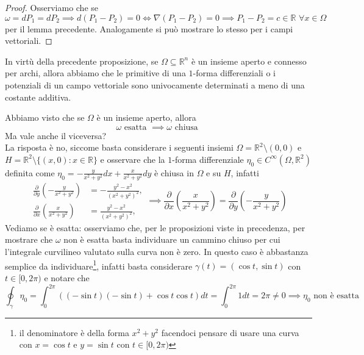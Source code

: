 \begin{proof}
Osserviamo che se $\omega = dP_1 = dP_2 \implies d(P_1 - P_2) = 0 \iff \nabla (P_1 - P_2) = 0 \implies P_1 - P_2 = c \in \mathbb{R} \, \, \forall x \in \Omega$ per il lemma precedente. Analogamente si può mostrare lo stesso per i campi vettoriali.
\end{proof}
\begin{remark}
In virtù della precedente proposizione, se $\Omega \subseteq \mathbb{R}^n$ è un insieme aperto e connesso per archi, allora abbiamo che le primitive di una $1$-forma differenziali o i potenziali di un campo vettoriale sono univocamente determinati
a meno di una costante additiva.
\end{remark}
\begin{remark}
Abbiamo visto che se $\Omega$ è un insieme aperto, allora
$$
\omega \text{ esatta } \implies \omega \text{ chiusa }
$$
Ma vale anche il viceversa? \\
La risposta è no, siccome basta considerare i seguenti insiemi $\Omega = \mathbb{R}^2 \setminus {(0, 0)}$ e $H = \mathbb{R}^2 \setminus \{(x, 0) : x \in \mathbb{R} \}$ e osservare che
la $1$-forma differenziale $\eta_0 \in C^\infty(\Omega, \mathbb{R}^2)$ definita come $\eta_0 = - \frac{y}{x^2 + y^2}dx + \frac{x}{x^2+y^2}dy$ è chiusa in $\Omega$ e su $H$, infatti
\begin{equation*}
\begin{align*}
    \frac{\partial}{\partial y} \left(- \frac{y}{x^2 + y^2} \right) &= - \frac{y^2 - x^2}{(x^2 + y^2)^2}, \\
    \frac{\partial}{\partial x} \left( \frac{x}{x^2 + y^2} \right) &= \frac{y^2 - x^2}{(x^2 + y^2)^2},
\end{align*}
\implies \frac{\partial}{\partial x} \left( \frac{x}{x^2 + y^2} \right) = \frac{\partial}{\partial y} \left( - \frac{y}{x^2 + y^2} \right)
\end{equation*}
Vediamo se è esatta: osserviamo che, per le proposizioni viste in precedenza, per mostrare che $\omega$ non è esatta basta individuare un cammino chiuso per cui l'integrale curvilineo valutato sulla curva non è zero. In questo caso è abbastanza semplice da individuare\footnote{il denominatore
è della forma $x^2 + y^2$ facendoci pensare di usare una curva con $x=\cos{t}$ e $y=\sin{t}$ con $t \in [0, 2 \pi)$}, infatti basta considerare $\gamma(t)=(\cos{t}, \sin{t})$ con $t \in [0, 2 \pi)$ e notare che
$$
\oint_\gamma \eta_0 = \int_0^{2 \pi} ((-\sin{t})(-\sin{t}) + \cos{t}\cos{t})dt = \int_0^{2 \pi} 1 dt = 2 \pi \neq 0 \implies \eta_0 \text{ non è esatta }
$$
\end{remark}
